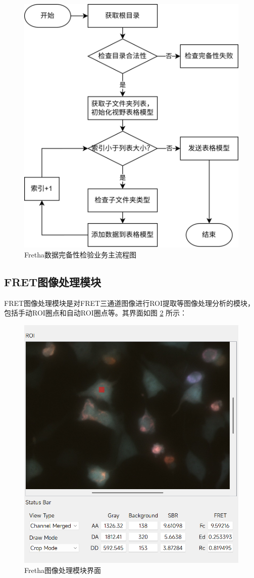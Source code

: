 \begin{figure}[htbp]
    \centering
    \includegraphics[width=0.6\linewidth]{../figures/2/2_数据完备性检验业务.drawio.png}
    \caption{Fretha数据完备性检验业务主流程图}
    \label{fig:fretha_data_check_flow}
\end{figure}

\subsection{FRET图像处理模块}

FRET图像处理模块是对FRET三通道图像进行ROI提取等图像处理分析的模块，包括手动ROI圈点和自动ROI圈点等。其界面如图 \ref{fig:fretha_imageprocess_ui} 所示：

\begin{figure}[htbp]
    \centering
    \includegraphics[width=0.75\linewidth]{../figures/2/2_图像处理模块界面.png}
    \caption{Fretha图像处理模块界面}
    \label{fig:fretha_imageprocess_ui}
\end{figure}

